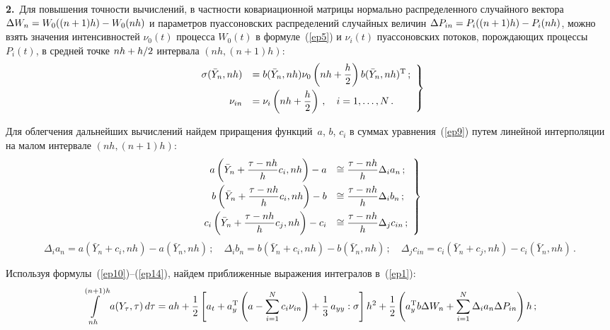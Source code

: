 {\textbf{2.}\ Для повышения точности вычислений, в частности
ковариационной матрицы нормально распределенного случайного вектора
$\Delta W_n\hm=W_0((n+1)h)-W_0(nh)$ и параметров пуассоновских распределений
случайных величин $\Delta P_{in}\hm=P_i((n+1)h)\hm-P_i(nh)$, можно взять
значения интенсивностей $\nu_0(t)$ процесса $W_0(t)$ в формуле~(\ref{ep5}) и
 $\nu_i(t)$ пуассоновских потоков, порождающих
процессы $P_i(t)$, в средней точке $nh\hm+h/2$ интервала $(nh,(n+1)h)$:
    \begin{equation}
    \left.
    \begin{array}{rl}
    \sigma(\bar Y_n,nh) &\displaystyle=b(\bar Y_n,nh)\nu_0\left(nh+\displaystyle\frac{\displaystyle h\mathstrut}{\displaystyle 2\mathstrut}\right)b(\bar Y_n,nh)^{\mathrm{T}}\,;\\[9pt]
    \nu_{in} &=\displaystyle\nu_i\left(nh+\displaystyle\frac{\displaystyle h\mathstrut}{\displaystyle 2\mathstrut}\right)\,,\quad i=1,\ldots,N\,.
    \end{array}
    \right\}
    \label{ep13}
    \end{equation}

Для облегчения дальнейших вычислений найдем приращения функций~$a$,
$b$, $c_i$ в суммах уравнения~(\ref{ep9}) путем линейной интерполяции на малом
интервале $(nh,(n+1)h)$:
    \begin{equation}
    \left.
    \begin{array}{rl}
a\left(\bar Y_n+{\displaystyle\frac{\displaystyle \tau-nh\mathstrut}{\displaystyle h\mathstrut}} c_i,nh\right)-a&\cong {\displaystyle\frac{\displaystyle \tau-nh\mathstrut}{\displaystyle h\mathstrut}} \Delta_i a_n\,;\\[9pt]
    b\left(\bar Y_n+{\displaystyle\frac{\displaystyle \tau-nh\mathstrut}{\displaystyle h\mathstrut}} c_i,nh\right)-b &\cong {\displaystyle\frac{\displaystyle \tau-nh\mathstrut}{\displaystyle h\mathstrut}} \Delta_i b_{n}\,;\\[9pt]
    c_i\left(\bar Y_n+{\displaystyle\frac{\displaystyle \tau-nh\mathstrut}{\displaystyle h\mathstrut}} c_j,nh\right)-c_i&\cong {\displaystyle\frac{\displaystyle \tau-nh\mathstrut}{\displaystyle h\mathstrut}} \Delta_j c_{in}\,;
    \end{array}
    \right \}
\label{ep14}
\end{equation}
    \begin{equation*}
    \Delta_i a_n =a(\bar Y_n+c_i,nh)-a(\bar Y_n,nh)\,;\quad
    \Delta_i b_{n}=b(\bar Y_n+c_i,nh)-b(\bar Y_n,nh)\,;\quad
\Delta_j c_{in} =c_i(\bar Y_n+c_j,nh)-c_i(\bar Y_n,nh)\,.
\end{equation*}

Используя формулы~(\ref{ep10})--(\ref{ep14}), найдем приближенные выражения
интегралов в~(\ref{ep1}):
    \begin{equation*}
    \int\limits_{nh}^{(n+1)h}a(Y_{\tau},\tau)\,d\tau=
    ah+\fr{1}{2}\left[a_t+a_y^{\mathrm{T}}\left( a-\sumin c_i\nu_{in}\right)+
    \fr{1}{3}\,a_{yy}:\sigma\right]h^2+
    \fr{1}{2}\left (a_y^{\mathrm{T}} b\Delta W_n +
    \sumin \Delta_i a_n \Delta P_{in}\right )h\,; %
    \end{equation*}
    
}
